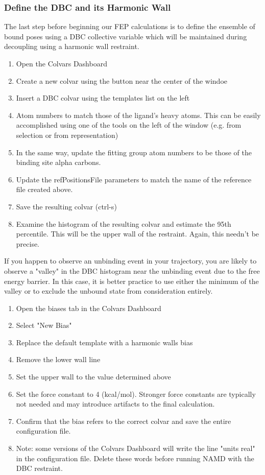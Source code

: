 \documentclass[9pt,tutorial]{Styling/livecoms}
\begin{document}
\subsubsection{Define the DBC and its Harmonic Wall}
\label{sec:defineDBC}
The last step before beginning our FEP calculations is to define the ensemble of bound poses using a DBC collective variable which will be maintained during decoupling using a harmonic wall restraint.
\begin{enumerate}
    \item Open the Colvars Dashboard
    \item Create a new colvar using the button near the center of the windoe
    \item Insert a DBC colvar using the templates list on the left
    \item Atom numbers to match those of the ligand's heavy atoms. This can be easily accomplished using one of the tools on the left of the window (e.g. from selection or from representation)
    \item In the same way, update the fitting group atom numbers to be those of the binding site alpha carbons.
    \item Update the refPositionsFile parameters to match the name of the reference file created above.
    \item Save the resulting colvar (ctrl-s)
    \item Examine the histogram of the resulting colvar and estimate the 95th percentile. This will be the upper wall of the restraint. Again, this needn't be precise.
\end{enumerate}
\begin{tcolorbox}[colback=blue!5!white,colframe=blue!75!black]
If you happen to observe an unbinding event in your trajectory, you are likely to observe a "valley" in the DBC histogram near the unbinding event due to the free energy barrier. In this case, it is better practice to use either the minimum of the valley or to exclude the unbound state from consideration entirely.
\end{tcolorbox}
\label{sec:defineHarmonicWall}
\begin{enumerate}[resume]
    \item Open the biases tab in the Colvars Dashboard
    \item Select "New Bias"
    \item Replace the default template with a harmonic walls bias
    \item Remove the lower wall line
    \item Set the upper wall to the value determined above
    \item Set the force constant to 4 (kcal/mol). Stronger force constants are typically not needed and may introduce artifacts to the final calculation.
    \item Confirm that the bias refers to the correct colvar and save the entire configuration file.
    \item Note: some versions of the Colvars Dashboard will write the line "units real" in the configuration file. Delete these words before running NAMD with the DBC restraint.
\end{enumerate}
\end{document}
